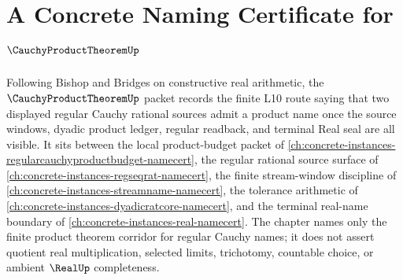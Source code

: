 \chapter{A Concrete Naming Certificate for $\CauchyProductTheoremUp$}
\label{ch:concrete-instances-cauchy-product-theorem-namecert}

Following Bishop and Bridges on constructive real arithmetic, the $\CauchyProductTheoremUp$ packet records the finite L10 route saying that two displayed regular Cauchy rational sources admit a product name once the source windows, dyadic product ledger, regular readback, and terminal Real seal are all visible. It sits between the local product-budget packet of \autoref{ch:concrete-instances-regularcauchyproductbudget-namecert}, the regular rational source surface of \autoref{ch:concrete-instances-regseqrat-namecert}, the finite stream-window discipline of \autoref{ch:concrete-instances-streamname-namecert}, the tolerance arithmetic of \autoref{ch:concrete-instances-dyadicratcore-namecert}, and the terminal real-name boundary of \autoref{ch:concrete-instances-real-namecert}. The chapter names only the finite product theorem corridor for regular Cauchy names; it does not assert quotient real multiplication, selected limits, trichotomy, countable choice, or ambient $\RealUp$ completeness.

